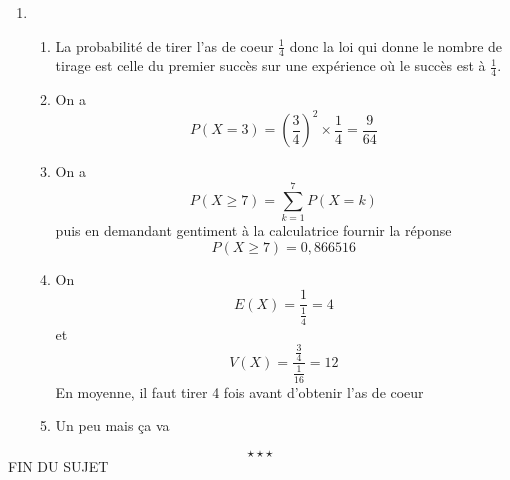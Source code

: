 \begin{enumerate}
\item 
\begin{enumerate} 
\item La probabilité de tirer l'as de coeur $\frac{1}{4}$ donc la loi qui donne le nombre de tirage est celle du premier succès sur une expérience où le succès est à $\frac{1}{4}$.
\item On a $$\boxed{P(X = 3) = \left(\frac{3}{4}\right)^2\times \frac{1}{4} = \frac{9}{64}}$$ 
\item On a $$P(X\geq7) = \sum_{k=1}^7 P(X=k)$$ puis en demandant gentiment à la calculatrice fournir la réponse 
$$\boxed{P(X\geq 7) = 0,866516}$$
\item On $$E(X) = \frac{1}{\frac{1}{4}} = 4$$ et $$V(X) = \frac{\frac{3}{4}}{\frac{1}{16}} = 12$$ En moyenne, il faut tirer 4 fois avant d'obtenir l'as de coeur 
\item Un peu mais ça va\end{enumerate}
\end{enumerate}
$$\star \star \star$$
\center
FIN DU SUJET
